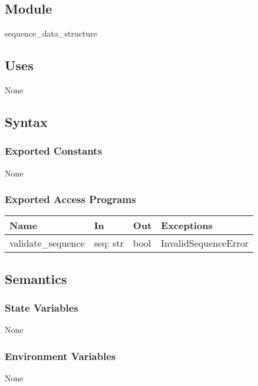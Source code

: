 \documentclass[12pt, titlepage]{article}
\begin{document}
\subsection{Module}

sequence\_data\_structure

\subsection{Uses}

None

\subsection{Syntax}

\subsubsection{Exported Constants}

None

\subsubsection{Exported Access Programs}

\begin{center}
\begin{tabular}{p{4cm} p{4cm} p{3cm} p{2cm}}
\hline
\textbf{Name} & \textbf{In} & \textbf{Out} & \textbf{Exceptions} \\
\hline
validate\_sequence & seq: str & bool & InvalidSequenceError \\
\hline
\end{tabular}
\end{center}

\subsection{Semantics}

\subsubsection{State Variables}

None

\subsubsection{Environment Variables}

None
\end{document}

